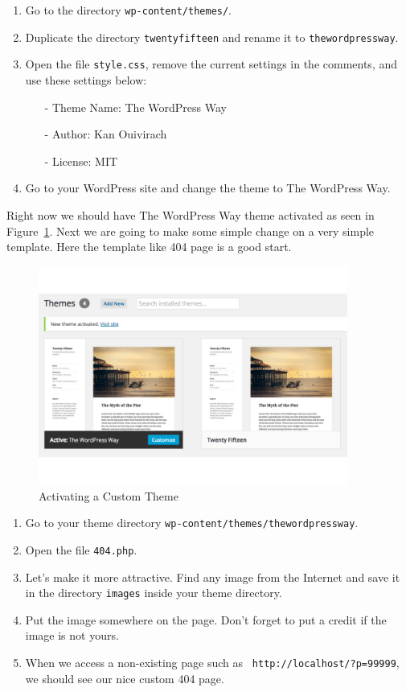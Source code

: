 \documentclass{article}
\begin{document}
\begin{enumerate}
    \item Go to the directory {\tt wp-content/themes/}.
    \item Duplicate the directory {\tt twentyfifteen} and rename it
        to {\tt thewordpressway}.
    \item Open the file {\tt style.css}, remove the current settings in the
        comments, and use these settings below:
        \begin{itemize}
            \item[-] Theme Name: The WordPress Way
            \item[-] Author: Kan Ouivirach
            \item[-] License: MIT
        \end{itemize}
    \item Go to your WordPress site and change the theme to The WordPress Way.
\end{enumerate}

\FloatBarrier

\noindent Right now we should have The WordPress Way theme activated as seen in
Figure~\ref{fig:activating-custom-theme}. Next we are going to make some simple
change on a very simple template. Here the template like 404 page is a good
start.

\begin{figure}[t]
    \centering
    \includegraphics[width=4in]{figures/activating-custom-theme}
    \caption{Activating a Custom Theme}
    \label{fig:activating-custom-theme}
\end{figure}

\begin{enumerate}
    \item Go to your theme directory {\tt wp-content/themes/thewordpressway}.
    \item Open the file {\tt 404.php}.
    \item Let's make it more attractive. Find any image from the Internet and
        save it in the directory {\tt images} inside your theme directory.
    \item Put the image somewhere on the page. Don't forget to put a credit if
        the image is not yours.
    \item When we access a non-existing page such as {\tt
        http://localhost/?p=99999}, we should see our nice custom 404 page.
\end{enumerate}
\end{document}
